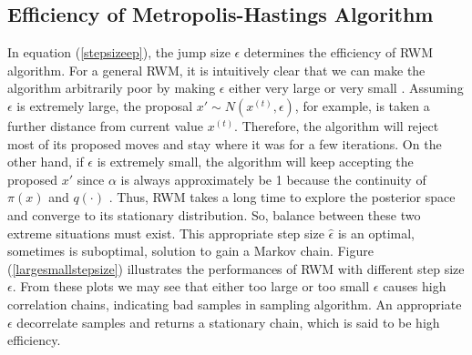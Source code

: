 




\subsection{Efficiency of Metropolis-Hastings Algorithm}\label{effMHA}

In equation (\ref{stepsizeep}), the jump size $\epsilon$ determines the efficiency of RWM algorithm. For a general RWM, it is intuitively clear that we can make the algorithm arbitrarily poor by making $\epsilon$ either very large or very small \cite{sherlock2010random}. Assuming $\epsilon$ is extremely large, the proposal $x'\sim N(x^{(t)},\epsilon)$, for example, is taken a further distance from current value $x^{(t)}$. Therefore, the algorithm will reject most of its proposed moves and stay where it was for a few iterations. On the other hand, if $\epsilon$ is extremely small, the algorithm will keep accepting the proposed $x'$ since $\alpha$ is always approximately be 1 because the continuity of $\pi(x)$ and $q(\cdot)$ \cite{roberts2001optimal}. Thus, RWM takes a long time to explore the posterior space and converge to its stationary distribution. So, balance between these two extreme situations must exist. This appropriate step size $\hat{\epsilon}$ is an optimal, sometimes is suboptimal, solution to gain a Markov chain. Figure (\ref{largesmallstepsize}) illustrates the performances of RWM with different step size $\epsilon$. From these plots we may see that either too large or too small $\epsilon$ causes high correlation chains, indicating bad samples in sampling algorithm. An appropriate $\epsilon$ decorrelate samples and returns a stationary chain, which is said to be high efficiency. 



